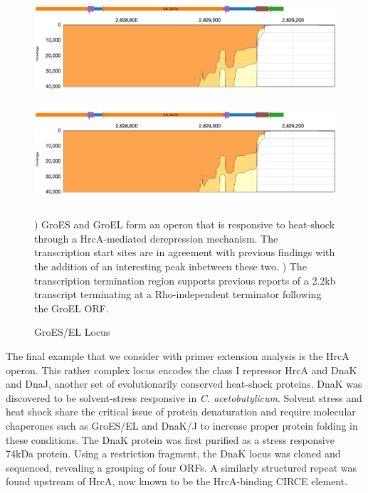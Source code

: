 \begin{figure}
\small
{\includegraphics[width=\textwidth,height=1.5in]{images/Assembly/Examples/GroESL/GroESL-TSS.png}
\label{fig:7a}}
{\includegraphics[width=\textwidth,height=1.5in]{images/Assembly/Examples/GroESL/GroESL-TSS.png}
\label{fig:7b}}
\caption{GroES/EL Locus}
) GroES and GroEL form an operon that is responsive to heat-shock through a HrcA-mediated derepression mechanism. The transcription start sites are in agreement with previous findings with the addition of an interesting peak inbetween these two. ) The transcription termination region supports previous reports of a 2.2kb transcript terminating at a Rho-independent terminator following the GroEL ORF.
\end{figure}

The final example that we consider with primer extension analysis is the HrcA operon. This rather complex locus encodes the class I repressor HrcA and DnaK and DnaJ, another set of evolutionarily conserved heat-shock proteins. DnaK was discovered to be solvent-stress responsive in \textit{C. acetobutylicum}\cite{73,74}. Solvent stress and heat shock share the critical issue of protein denaturation and require molecular chaperones such as GroES/EL and DnaK/J to increase proper protein folding in these conditions. The DnaK protein was first purified as a stress responsive 74kDa protein\cite{74}. Using a restriction fragment, the DnaK locus was cloned and sequenced, revealing a grouping of four ORFs\cite{79}. A similarly structured repeat was found upstream of HrcA, now known to be the HrcA-binding CIRCE element\cite{79}. 



